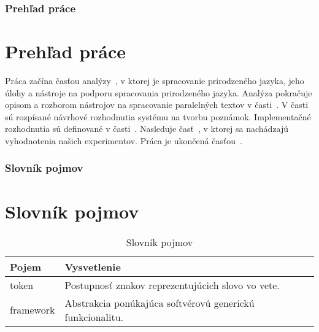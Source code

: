 {
	\subsection{Prehľad práce}
}
{
	\chapter{Prehľad práce}
}
Práca začína časťou analýzy~, v ktorej je spracovanie prirodzeného jazyka, jeho úlohy a nástroje na podporu spracovania prirodzeného jazyka. Analýza pokračuje opisom a rozborom nástrojov na spracovanie paralelných textov v časti~. V časti~ sú rozpísané návrhové rozhodnutia systému na tvorbu poznámok. Implementačné rozhodnutia sú definované v časti~. Nasleduje časť~, v ktorej sa nachádzajú vyhodnotenia našich experimentov. Práca je ukončená časťou~.

{
	\subsection{Slovník pojmov}
}
{
	\chapter{Slovník pojmov}
}

\begin{table}[H]
	\centering
	\caption{Slovník pojmov}
	\label{introduction:table:dictionary}
	\begin{tabular}{|l|l|}
		\hline
		\textbf{Pojem} & \textbf{Vysvetlenie}  \\ \hline
		token & Postupnosť znakov reprezentujúcich slovo vo vete. \\ \hline
		framework & Abstrakcia ponúkajúca softvérovú generickú funkcionalitu. \\ \hline
	\end{tabular}
\end{table}